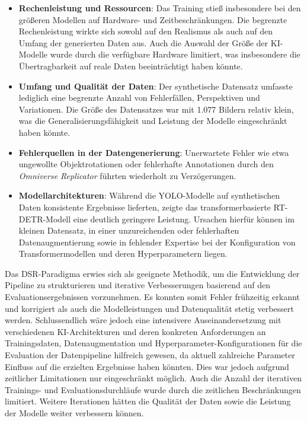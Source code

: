 \begin{itemize}
    \item \textbf{Rechenleistung und Ressourcen}: Das Training stieß insbesondere bei den größeren Modellen auf Hardware- und Zeitbeschränkungen. Die begrenzte Rechenleistung wirkte sich sowohl auf den Realismus als auch auf den Umfang der generierten Daten aus. Auch die Auswahl der Größe der \ac{KI}-Modelle wurde durch die verfügbare Hardware limitiert, was insbesondere die Übertragbarkeit auf reale Daten beeinträchtigt haben könnte.
    \item \textbf{Umfang und Qualität der Daten}: Der synthetische Datensatz umfasste lediglich eine begrenzte Anzahl von Fehlerfällen, Perspektiven und Variationen. Die Größe des Datensatzes war mit 1.077 Bildern relativ klein, was die Generalisierungsfähigkeit und Leistung der Modelle eingeschränkt haben könnte.
    \item \textbf{Fehlerquellen in der Datengenerierung}: Unerwartete Fehler wie etwa ungewollte Objektrotationen oder fehlerhafte Annotationen durch den \textit{Omniverse Replicator} führten wiederholt zu Verzögerungen.
    \item \textbf{Modellarchitekturen}: Während die \ac{YOLO}-Modelle auf synthetischen Daten konsistente Ergebnisse lieferten, zeigte das transformerbasierte \ac{RT-DETR}-Modell eine deutlich geringere Leistung. Ursachen hierfür können im kleinen Datensatz, in einer unzureichenden oder fehlerhaften Datenaugmentierung sowie in fehlender Expertise bei der Konfiguration von Transformermodellen und deren Hyperparametern liegen.
\end{itemize}

Das \ac{DSR}-Paradigma erwies sich als geeignete Methodik, um die Entwicklung der Pipeline zu strukturieren und iterative Verbesserungen basierend auf den Evaluationsergebnissen vorzunehmen. Es konnten somit Fehler frühzeitig erkannt und korrigiert als auch die Modelleistungen und Datenqualität stetig verbessert werden. Schlussendlich wäre jedoch eine intensivere Auseinandersetzung mit verschiedenen \ac{KI}-Architekturen und deren konkreten Anforderungen an Trainingsdaten, Datenaugmentation und Hyperparameter-Konfigurationen für die Evaluation der Datenpipeline hilfreich gewesen, da aktuell zahlreiche Parameter Einfluss auf die erzielten Ergebnisse haben könnten. Dies war jedoch aufgrund zeitlicher Limitationen nur eingeschränkt möglich. Auch die Anzahl der iterativen Trainings- und Evaluationsdurchläufe wurde durch die zeitlichen Beschränkungen limitiert. Weitere Iterationen hätten die Qualität der Daten sowie die Leistung der Modelle weiter verbessern können.


